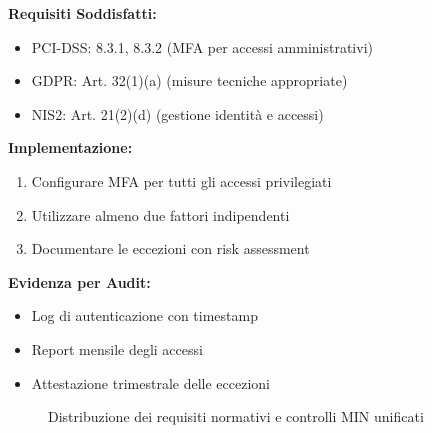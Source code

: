 \begin{tcolorbox}[title=Esempio: Controllo MIN-AC-001 - Autenticazione Multi-Fattore]
\textbf{Requisiti Soddisfatti:}
\begin{itemize}
\item PCI-DSS: 8.3.1, 8.3.2 (MFA per accessi amministrativi)
\item GDPR: Art. 32(1)(a) (misure tecniche appropriate)
\item NIS2: Art. 21(2)(d) (gestione identità e accessi)
\end{itemize}

\textbf{Implementazione:}
\begin{enumerate}
\item Configurare MFA per tutti gli accessi privilegiati
\item Utilizzare almeno due fattori indipendenti
\item Documentare le eccezioni con risk assessment
\end{enumerate}

\textbf{Evidenza per Audit:}
\begin{itemize}
\item Log di autenticazione con timestamp
\item Report mensile degli accessi
\item Attestazione trimestrale delle eccezioni
\end{itemize}
\end{tcolorbox}

\begin{figure}[h]
\centering
{}
\caption{Distribuzione dei requisiti normativi e controlli MIN unificati}
\end{figure}


